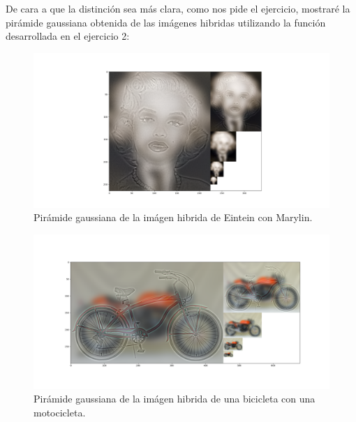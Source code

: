 \documentclass[12pt, spanish]{article}
\begin{document}
De cara a que la distinción sea más clara, como nos pide el ejercicio, mostraré la pirámide gaussiana obtenida de las imágenes hibridas utilizando la función desarrollada en el ejercicio 2:



\begin{figure}[H]
  \centering
      \includegraphics[width=\textwidth]{hibridas_color/PE-M.png}
 		 \caption{Pirámide gaussiana de la imágen hibrida de Eintein con Marylin.}
  		\label{fig:ej2al}

\end{figure}


\begin{figure}[H]
  \centering
      \includegraphics[width=\textwidth]{hibridas_color/PB-M.png}
 		 \caption{Pirámide gaussiana de la imágen hibrida de una bicicleta con una motocicleta.}
  		\label{fig:ej2al}

\end{figure}
\end{document}

